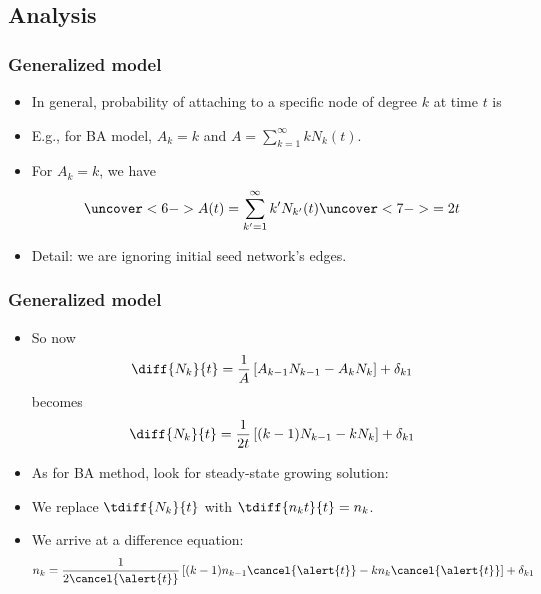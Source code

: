 \subsection{Analysis}

\begin{frame}[label=]
  \frametitle{Generalized model}  
  
  \begin{itemize}
  \item<1->
    In general, probability of attaching to a \alert{specific node}
    of degree $k$ at time $t$ is
  \item<4->
    E.g., for BA model, $A_k = k$ and $A = \sum_{k=1}^{\infty} k N_k(t)$.
  \item<5-> For $A_k=k$, we have
    $$
    \uncover<6->{
    A(t) 
    = 
    \sum_{k'=1}^{\infty}
    k' N_{k'}(t)
    }
    \uncover<7->{
    = 2t     
    }
    $$
  \item<9->
      Detail: we are ignoring initial seed network's edges.
  \end{itemize}

\end{frame}


\begin{frame}[label=]
  \frametitle{Generalized model}  

  \begin{itemize}
  \item<1->
    So now
    $$
    \diff{N_k}{t}
    =
    \frac{1}{A}
    \left[
      A_{k-1} N_{k-1} - A_{k} N_{k}
    \right]
    + \delta_{k1}
    $$
    becomes
    $$
    \diff{N_k}{t}
    =
    \frac{1}{2t}
    \left[
      (k-1) N_{k-1} - k N_{k}
    \right]
    + \delta_{k1}
    $$
  \item<2->
    As for BA method, look for steady-state growing solution:
  \item<4->
    We replace $\tdiff{N_k}{t}$ with $\tdiff{n_k t}{t} = n_k$.
  \item<5->
    We arrive at a difference equation:
    $$
    n_k
    =
    \frac{1}{2\cancel{\alert{t}}}
    \left[
      (k-1) n_{k-1}\cancel{\alert{t}} - k n_{k}\cancel{\alert{t}}
    \right]
    + \delta_{k1}
    $$
  \end{itemize}

\end{frame}

